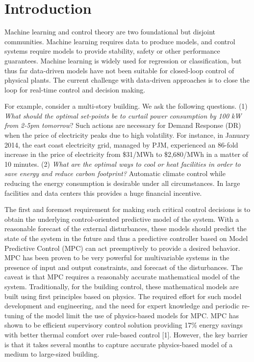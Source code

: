 \section{Introduction}

Machine learning and control theory are two foundational but disjoint communities.
Machine learning requires data to produce models, and control systems require models to provide stability, safety or other performance guarantees.
Machine learning is widely used for regression or classification, but thus far data-driven models have not been suitable for closed-loop control of physical plants.
The current challenge with data-driven approaches is to close the loop for real-time control and decision making.

For example, consider a multi-story building.
We ask the following questions.
\noindent (1) \textit{What should the optimal set-points be to curtail power consumption by 100 kW from 2-5pm tomorrow}?
Such actions are necessary for Demand Response (DR) when the price of electricity peaks due to high volatility.
For instance, in January 2014, the east coast electricity grid, managed by PJM, experienced an 86-fold increase in the price of electricity from \$31/MWh to \$2,680/MWh in a matter of 10 minutes.
\noindent (2) \textit{What are the optimal ways to cool or heat facilities in order to save energy and reduce carbon footprint?}
Automatic climate control while reducing the energy consumption is desirable under all circumstances. 
In large facilities and data centers this provides a huge financial incentive.

The first and foremost requirement for making such critical control decisions is to obtain the underlying control-oriented predictive model of the system.
With a reasonable forecast of the external disturbances, these models should predict the state of the system in the future and thus a predictive controller based on Model Predictive Control (MPC) can act preemptively to provide a desired behavior.
MPC has been proven to be very powerful for multivariable systems in the presence of input and output constraints, and forecast of the disturbances.
The caveat is that MPC requires a reasonably accurate mathematical model of the system.
Traditionally, for the building control, these mathematical models are built using first principles based on physics. 
The required effort for such model development and engineering, and the need for expert knowledge and periodic re-tuning of the model limit the use of physics-based models for MPC.
MPC has shown to be efficient supervisory control solution providing 17\% energy savings with better thermal comfort over rule-based control [1].
However, the key barrier is that it takes several months to capture accurate physics-based model of a medium to large-sized building.

